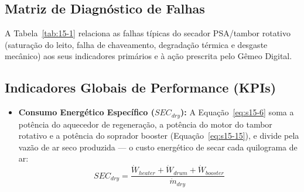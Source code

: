 \documentclass[12pt,a4paper]{article}
\numberwithin{equation}{section}
\numberwithin{table}{section}
\numberwithin{figure}{section}
\begin{document}
{		\subsection{\textbf{Matriz de Diagnóstico de Falhas}}
		A Tabela~\ref{tab:15-1} relaciona as falhas típicas do secador PSA/tambor rotativo (saturação do leito, falha de chaveamento, degradação térmica e desgaste mecânico) aos seus indicadores primários e à ação prescrita pelo Gêmeo Digital.
		\begin{table}[h!tbp]
			\centering
			\caption[Matriz de falhas do secador PSA e do tambor rotativo]{Matriz de diagnóstico de falhas do secador PSA e do tambor rotativo (HOC).}
			\label{tab:15-1}
		\end{table}
		
		\subsection{\textbf{Indicadores Globais de Performance (KPIs)}}
		
		\begin{itemize}
			\item \textbf{Consumo Energético Específico ($SEC_{dry}$):} A Equação~\eqref{eq:s15-6} soma a potência do aquecedor de regeneração, a potência do motor do tambor rotativo e a potência do soprador booster (Equação~\eqref{eq:s15-15}), e divide pela vazão de ar seco produzida — o custo energético de secar cada quilograma de ar:
			\begin{equation}\label{eq:s15-6}
SEC_{dry} = \frac{\dot{W}_{heater} + \dot{W}_{drum} + \dot{W}_{booster}}{\dot{m}_{dry}}
\end{equation}


\end{itemize}}
\end{document}
